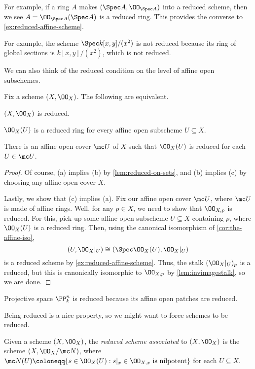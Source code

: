 \documentclass[../notes.tex]{subfiles}
\begin{document}
\begin{remark}
	For example, if a ring $A$ makes $(\Spec A,\OO_{\Spec A})$ into a reduced scheme, then we see $A=\OO_{\Spec A}(\Spec A)$ is a reduced ring. This provides the converse to \autoref{ex:reduced-affine-scheme}.
\end{remark}
\begin{nex}
	For example, the scheme $\Spec k[x,y]/(x^2)$ is not reduced because its ring of global sections is $k[x,y]/(x^2)$, which is not reduced.
\end{nex}
We can also think of the reduced condition on the level of affine open subschemes.
\begin{lemma}
	Fix a scheme $(X,\OO_X)$. The following are equivalent.
	\begin{listalph}
		\item $(X,\OO_X)$ is reduced.
		\item $\OO_X(U)$ is a reduced ring for every affine open subscheme $U\subseteq X$.
		\item There is an affine open cover $\mc U$ of $X$ such that $\OO_X(U)$ is reduced for each $U\in\mc U$.
	\end{listalph}
\end{lemma}
\begin{proof}
	Of course, (a) implies (b) by \autoref{lem:reduced-on-sets}, and (b) implies (c) by choosing any affine open cover $X$.
	
	Lastly, we show that (c) implies (a). Fix our affine open cover $\mc U$, where $\mc U$ is made of affine rings. Well, for any $p\in X$, we need to show that $\OO_{X,p}$ is reduced. For this, pick up some affine open subscheme $U\subseteq X$ containing $p$, where $\OO_X(U)$ is a reduced ring. Then, using the canonical isomorphism of \autoref{cor:the-affine-iso},
	\[(U,\OO_X|_U)\cong(\Spec\OO_X(U),\OO_X|_U)\]
	is a reduced scheme by \autoref{ex:reduced-affine-scheme}. Thus, the stalk $(\OO_X|_U)_p$ is a reduced, but this is canonically isomorphic to $\OO_{X,p}$ by \autoref{lem:invimagestalk}, so we are done.
\end{proof}
\begin{example} \label{ex:proj-is-reduced}
	Projective space $\PP^n_k$ is reduced because its affine open patches are reduced.
\end{example}
Being reduced is a nice property, so we might want to force schemes to be reduced.
\begin{definition}
	Given a scheme $(X,\OO_X)$, the \textit{reduced scheme associated} to $(X,\OO_X)$ is the scheme $(X,\OO_X/\mc N)$, where $\mc N(U)\coloneqq\{s\in\OO_X(U):s|_x\in\OO_{X,x}\text{ is nilpotent}\}$ for each $U\subseteq X$.
\end{definition}
\end{document}
